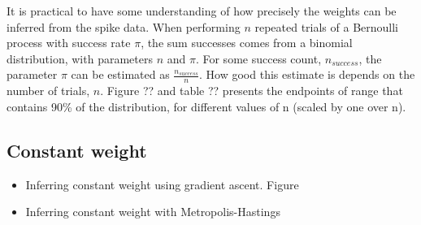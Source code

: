 It is practical to have some understanding of how precisely the weights can be inferred from the spike data. When performing $n$ repeated trials of a Bernoulli process with success rate $\pi$, the sum successes comes from a binomial distribution, with parameters $n$ and $\pi$. For some success count, $n_{success}$, the parameter $\pi$ can be estimated as $\frac{n_{success}}{n}$. How good this estimate is depends on the number of trials, $n$. Figure ?? and table ?? presents the endpoints of range that contains 90\% of the distribution, for different values of n (scaled by one over n). 



\subsection{Constant weight}

\begin{itemize}
    \item Inferring constant weight using gradient ascent. Figure
    \item Inferring constant weight with Metropolis-Hastings
\end{itemize}

